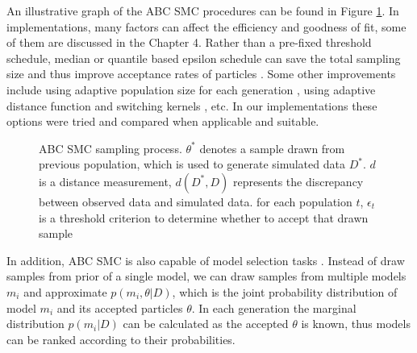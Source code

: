 An illustrative graph of the ABC SMC procedures can be found in Figure \ref{fig:smc}. In implementations, many factors can affect the efficiency and goodness of fit, some of them are discussed in the Chapter 4. Rather than a pre-fixed threshold schedule, median or quantile based epsilon schedule can save the total sampling size and thus improve acceptance rates of particles \cite{threshold}. Some other improvements include using adaptive population size for each generation \cite{population}, using adaptive distance function \cite{ref:adpt_dis} and switching kernels \cite{ref:kernel}, etc. In our implementations these options were tried and compared when applicable and suitable.

\begin{figure}[t]
    \begin{center}
    \end{center}

    \caption[ABC SMC sampling process]%
    {ABC SMC sampling process. $\theta^*$ denotes a sample drawn from previous population, which is used to generate simulated data $D^*$. $d$ is a distance measurement, $d(D^*,D)$ represents the discrepancy between observed data and simulated data. for each population $t$, $\epsilon_t$ is a threshold criterion to determine whether to accept that drawn sample}
    \label{fig:smc}

\end{figure}

In addition, ABC SMC is also capable of model selection tasks \cite{model_compare}. Instead of draw samples from prior of a single model, we can draw samples from multiple models $m_i$ and approximate $p(m_i, \theta|D)$, which is the joint probability distribution of model $m_i$ and its accepted particles $\theta$. In each generation the marginal distribution $p(m_i|D)$ can be calculated as the accepted ${\theta}$ is known, thus models can be ranked according to their probabilities.

